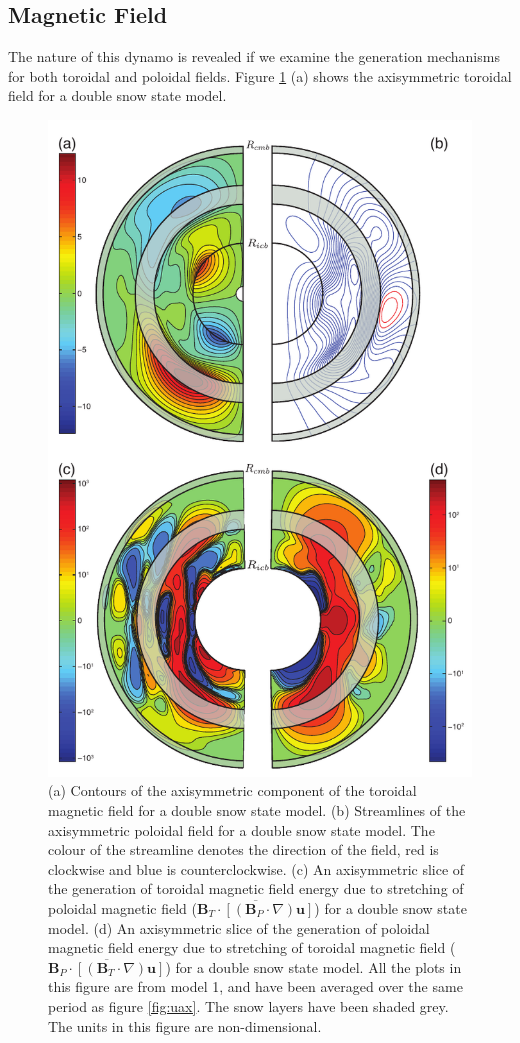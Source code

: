 \subsection{Magnetic Field}
The nature of this dynamo is revealed if we examine the generation mechanisms for both toroidal and poloidal fields. Figure \ref{fig:maggen} (a) shows the axisymmetric toroidal field for a double snow state model.
%
\begin{figure}
	\centering
	\noindent\includegraphics[width=.7\linewidth]{Chapter4/figures/aximaggen}
	\caption{(a) Contours of the axisymmetric component of the toroidal magnetic field for a double snow state model. (b) Streamlines of the axisymmetric poloidal field for a double snow state model. The colour of the streamline denotes the direction of the field, red is clockwise and blue is counterclockwise. (c) An axisymmetric slice of the generation of toroidal magnetic field energy due to stretching of poloidal magnetic field ($\overline{\mathbf{B}_{T}\cdot\left[\left(\mathbf{B}_{P}\cdot\nabla\right)\mathbf{u}\right]}$) for a double snow state model. (d) An axisymmetric slice of the generation of poloidal magnetic field energy due to stretching of toroidal magnetic field ($\overline{\mathbf{B}_{P}\cdot\left[\left(\mathbf{B}_{T}\cdot\nabla\right)\mathbf{u}\right]}$) for a double snow state model. All the plots in this figure are from model 1, and have been averaged over the same period as figure \ref{fig:uax}. The snow layers have been shaded grey. The units in this figure are non-dimensional.}
	\label{fig:maggen}
\end{figure}
